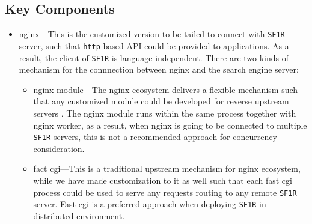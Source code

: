 \subsection{Key Components}
\begin{itemize}
 \item nginx---This is the customized version to be tailed to connect with \texttt{SF1R} server, such that \texttt{http} based API could be provided to applications. As a result, 
 the client of \texttt{SF1R} is language independent. There are two kinds of mechanism for the connnection between nginx and the search engine server:
  \begin{itemize}
   \item nginx module---The nginx ecosystem delivers a flexible mechanism such that any customized module could be developed for reverse upstream servers \cite{nginx}. The nginx module runs within
   the same process together with nginx worker, as a result, when nginx is going to be connected to multiple \texttt{SF1R} servers, this is not a recommended approach for concurrency consideration.
   \item fact cgi---This is a traditional upstream mechanism for nginx ecosystem, while we have made customization to it as well such that each fast cgi process could be used to serve
   any requests routing to any remote \texttt{SF1R} server. Fast cgi is a preferred approach when deploying \texttt{SF1R} in distributed environment.
  \end{itemize}


\end{itemize}
